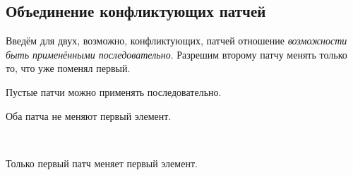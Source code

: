 \subsection{Объединение конфликтующих патчей}

Введём для двух, возможно, конфликтующих, патчей отношение
\emph{возможности быть применёнными последовательно}. Разрешим второму
патчу менять только то, что уже поменял первый. 
    
\begin{code}%
\>[0]\<[2]%
\>[2]  \AgdaSymbol{:}  \AgdaSymbol{\{}\AgdaSymbol{\}\{}  \AgdaSymbol{:}  \AgdaSymbol{\}}          \<[71]%
\>[71]\<%
\end{code}

Пустые патчи можно применять последовательно. 

\begin{code}%
\>[2]\<[4]%
\>[4] \AgdaSymbol{:}   \<%
\end{code}

Оба патча не меняют первый элемент. 

\begin{code}%
\>[2]\<[4]%
\>[4] \AgdaSymbol{:}  \AgdaSymbol{\{}\AgdaSymbol{\}\{}  \AgdaSymbol{:}  \AgdaSymbol{\}} \AgdaSymbol{\{} \AgdaSymbol{:}  \AgdaSymbol{\}} \AgdaSymbol{\{} \AgdaSymbol{:}  \AgdaSymbol{\}}\<%
\\
\>[4]\<[6]%
\>[6] \AgdaSymbol{(}  \AgdaSymbol{)}  \AgdaSymbol{(} \AgdaSymbol{)}  \AgdaSymbol{(} \AgdaSymbol{)}\<%
\end{code}

Только первый патч меняет первый элемент.

